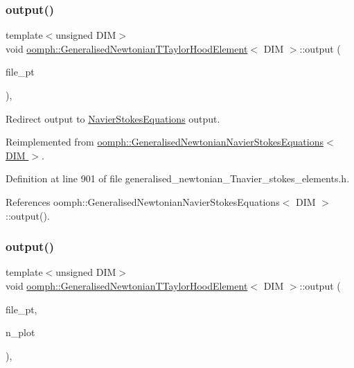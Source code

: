 \subsubsection{\texorpdfstring{output()}{output()}\hspace{0.1cm}{\footnotesize\ttfamily [3/4]}}
{\footnotesize\ttfamily template$<$unsigned D\+IM$>$ \\
void \hyperlink{classoomph_1_1GeneralisedNewtonianTTaylorHoodElement}{oomph\+::\+Generalised\+Newtonian\+T\+Taylor\+Hood\+Element}$<$ D\+IM $>$\+::output (\begin{DoxyParamCaption}\item[{F\+I\+LE $\ast$}]{file\+\_\+pt }\end{DoxyParamCaption})\hspace{0.3cm}{\ttfamily [inline]}, {\ttfamily [virtual]}}



Redirect output to \hyperlink{classoomph_1_1NavierStokesEquations}{Navier\+Stokes\+Equations} output. 



Reimplemented from \hyperlink{classoomph_1_1GeneralisedNewtonianNavierStokesEquations_a0f56934ff2c1092a8e9bc457c93bf8cb}{oomph\+::\+Generalised\+Newtonian\+Navier\+Stokes\+Equations$<$ D\+I\+M $>$}.



Definition at line 901 of file generalised\+\_\+newtonian\+\_\+\+Tnavier\+\_\+stokes\+\_\+elements.\+h.



References oomph\+::\+Generalised\+Newtonian\+Navier\+Stokes\+Equations$<$ D\+I\+M $>$\+::output().

\mbox{\label{classoomph_1_1GeneralisedNewtonianTTaylorHoodElement_acc88cfe3517146492eff605648a22ee3}} 
\subsubsection{\texorpdfstring{output()}{output()}\hspace{0.1cm}{\footnotesize\ttfamily [4/4]}}
{\footnotesize\ttfamily template$<$unsigned D\+IM$>$ \\
void \hyperlink{classoomph_1_1GeneralisedNewtonianTTaylorHoodElement}{oomph\+::\+Generalised\+Newtonian\+T\+Taylor\+Hood\+Element}$<$ D\+IM $>$\+::output (\begin{DoxyParamCaption}\item[{F\+I\+LE $\ast$}]{file\+\_\+pt,  }\item[{const unsigned \&}]{n\+\_\+plot }\end{DoxyParamCaption})\hspace{0.3cm}{\ttfamily [inline]}, {\ttfamily [virtual]}}



